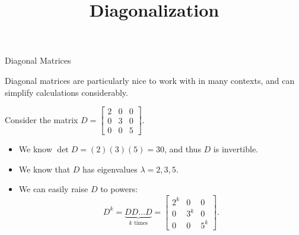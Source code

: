 \documentclass[xcolor=dvipsnames,aspectratio=169,t]{beamer}
\title{Diagonalization}
\begin{document}
\maketitle

\begin{frame}{Diagonal Matrices}
  \medskip

  \alert{Diagonal matrices} are particularly nice to work with in many contexts, and can simplify calculations considerably.
  \bigskip
  
  Consider the matrix $D = \begin{bmatrix} 2 & 0 & 0 \\ 0 & 3 & 0 \\ 0 & 0 & 5 \end{bmatrix}$.
  \medskip
  
  \begin{itemize}
  \item We know $\det D = (2)(3)(5)=30$, and thus $D$ is invertible.
  \smallskip
  \item We know that $D$ has eigenvalues $\lambda = 2, 3, 5$.
  \smallskip
  \item We can easily raise $D$ to powers:
  \[ D^k = \underset{\text{$k$ times}}{\underbrace{D D \ldots D}} = \begin{bmatrix}2^k & 0 & 0 \\ 0 & 3^k & 0 \\ 0 & 0 & 5^k\end{bmatrix}. \]
  \end{itemize}
\end{frame}
\end{document}
